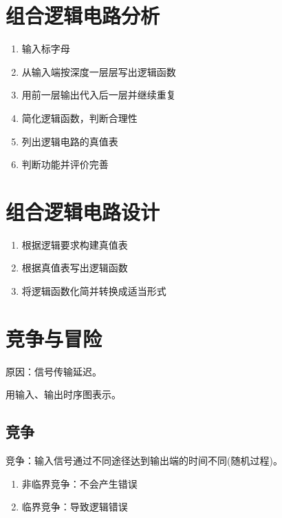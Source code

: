 \newpage

\section{组合逻辑电路分析}

\begin{enumerate}

    \item 输入标字母
    \item 从输入端按深度一层层写出逻辑函数
    \item 用前一层输出代入后一层并继续重复
    \item 简化逻辑函数，判断合理性
    \item 列出逻辑电路的真值表
    \item 判断功能并评价完善

\end{enumerate}

\section{组合逻辑电路设计}

\begin{enumerate}

    \item 根据逻辑要求构建真值表
    \item 根据真值表写出逻辑函数
    \item 将逻辑函数化简并转换成适当形式

\end{enumerate}

\newpage

\section{竞争与冒险}

原因：信号传输延迟。

用输入、输出时序图表示。

\subsection{竞争}

竞争：输入信号通过不同途径达到输出端的时间不同(随机过程)。

\begin{enumerate}

    \item 非临界竞争：不会产生错误
    \item 临界竞争：导致逻辑错误

\end{enumerate}

